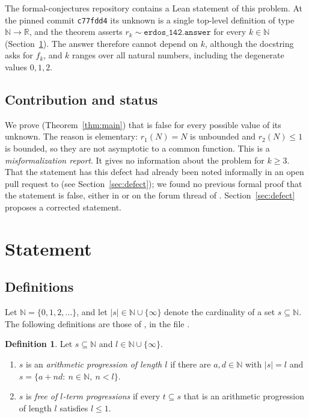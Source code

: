 \documentclass[11pt]{amsart}
\theoremstyle{plain}
\theoremstyle{definition}
\newtheorem{definition}[theorem]{Definition}
\newcommand{\N}{\mathbb{N}}
\newcommand{\R}{\mathbb{R}}
\newcommand{\Ninf}{\N\cup\{\infty\}}
\begin{document}
The formal-conjectures repository \cite{FC} contains a Lean statement  of this problem. At the pinned commit \texttt{c77fdd4} its unknown is a single top-level definition  of type $\N\to\R$, and the theorem asserts $r_k\sim\texttt{erdos\_142.answer}$ for every $k\in\N$ (Section~\ref{sec:statement}). The answer therefore cannot depend on $k$, although the docstring asks for $f_k$, and $k$ ranges over all natural numbers, including the degenerate values $0,1,2$.

\subsection*{Contribution and status}
We prove (Theorem~\ref{thm:main}) that  is false for every possible value of its unknown. The reason is elementary: $r_1(N)=N$ is unbounded and $r_2(N)\le 1$ is bounded, so they are not asymptotic to a common function. This is a \emph{misformalization report}. It gives no information about the problem for $k\ge 3$. That the statement has this defect had already been noted informally in an open pull request to \cite{FC} (see Section~\ref{sec:defect}); we found no previous formal proof that the statement is false, either in \cite{FC} or on the forum thread of \cite{EP142}. Section~\ref{sec:defect} proposes a corrected statement.

\section{Statement}\label{sec:statement}

\subsection{Definitions}
Let $\N=\{0,1,2,\dots\}$, and let $|s|\in\Ninf$ denote the cardinality of a set $s\subseteq\N$. The following definitions are those of \cite{FC}, in the file .

\begin{definition}\label{def:ap}
Let $s\subseteq\N$ and $l\in\Ninf$.
\begin{enumerate}
\item $s$ is an \emph{arithmetic progression of length $l$} if there are $a,d\in\N$ with $|s|=l$ and $s=\{a+nd:\ n\in\N,\ n<l\}$.
\item $s$ is \emph{free of $l$-term progressions} if every $t\subseteq s$ that is an arithmetic progression of length $l$ satisfies $l\le 1$.
\end{enumerate}
\end{definition}
\end{document}
